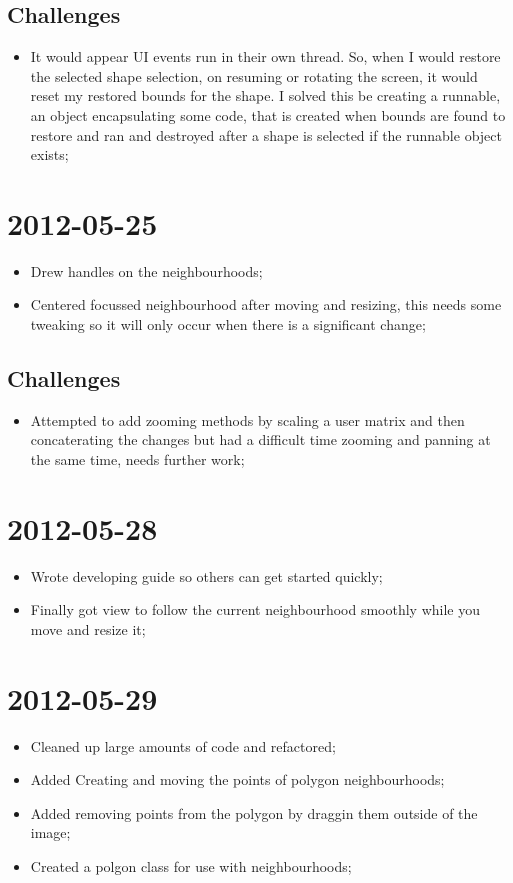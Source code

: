\documentclass{report}
\begin{document}
\subsection*{Challenges}
\begin{itemize}
  \item 
    It would appear UI events run in their own thread. So, when I would restore the selected shape selection, on resuming or rotating the screen, it would reset my restored bounds for the shape. I solved this be creating a runnable, an object encapsulating some code, that is created when bounds are found to restore and ran and destroyed after a shape is selected if the runnable object exists;
\end{itemize}

\section*{2012-05-25}
\begin{itemize}
  \item 
    Drew handles on the neighbourhoods;
  \item
    Centered focussed neighbourhood after moving and resizing, this needs some tweaking so it will only occur when there is a significant change;
\end{itemize}
\subsection*{Challenges}
\begin{itemize}
  \item 
    Attempted to add zooming methods by scaling a user matrix and then concaterating the changes but had a difficult time zooming and panning at the same time, needs further work;
\end{itemize}

\section*{2012-05-28}
\begin{itemize}
  \item 
    Wrote developing guide so others can get started quickly;
  \item
    Finally got view to follow the current neighbourhood smoothly while you move and resize it;
\end{itemize}

\section*{2012-05-29}
\begin{itemize}
  \item 
    Cleaned up large amounts of code and refactored;
  \item
    Added Creating and moving the points of polygon neighbourhoods;
  \item
    Added removing points from the polygon by draggin them outside of the image;
  \item
    Created a polgon class for use with neighbourhoods;
\end{itemize}
\end{document}
